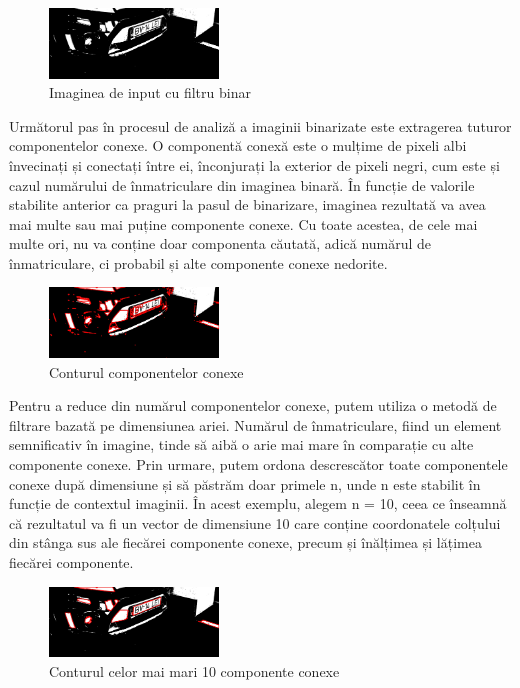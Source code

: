 \documentclass[a4paper,12pt]{report}
\begin{document}
\begin{figure}[h]
    \centering
    \includegraphics[width=0.4\textwidth]{images/binary.jpg}
    \caption{Imaginea de input cu filtru binar}
\end{figure}
\FloatBarrier

Următorul pas în procesul de analiză a imaginii binarizate este extragerea tuturor componentelor conexe. O componentă conexă este o mulțime de pixeli albi învecinați și conectați între ei, înconjurați la exterior de pixeli negri, cum este și cazul numărului de înmatriculare din imaginea binară. În funcție de valorile stabilite anterior ca praguri la pasul de binarizare, imaginea rezultată va avea mai multe sau mai puține componente conexe. Cu toate acestea, de cele mai multe ori, nu va conține doar componenta căutată, adică numărul de înmatriculare, ci probabil și alte componente conexe nedorite.

\begin{figure}[h]
    \centering
    \includegraphics[width=0.4\textwidth]{images/all_connected_components.jpg}
    \caption{Conturul componentelor conexe}
\end{figure}
\FloatBarrier

Pentru a reduce din numărul componentelor conexe, putem utiliza o metodă de filtrare bazată pe dimensiunea ariei. Numărul de înmatriculare, fiind un element semnificativ în imagine, tinde să aibă o arie mai mare în comparație cu alte componente conexe. Prin urmare, putem ordona descrescător toate componentele conexe după dimensiune și să păstrăm doar primele n, unde n este stabilit în funcție de contextul imaginii. În acest exemplu, alegem n = 10, ceea ce înseamnă că rezultatul va fi un vector de dimensiune 10 care conține coordonatele colțului din stânga sus ale fiecărei componente conexe, precum și înălțimea și lățimea fiecărei componente.

\begin{figure}[h]
    \centering
    \includegraphics[width=0.4\textwidth]{images/connected_components.jpg}
    \caption{Conturul celor mai mari 10 componente conexe}
\end{figure}
\FloatBarrier
\end{document}
